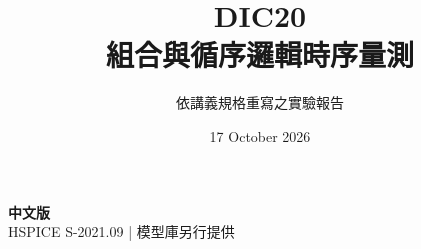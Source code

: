 \documentclass[11pt,a4paper]{article}
\title{\color{accent}DIC20\\[4pt]組合與循序邏輯時序量測}
\author{依講義規格重寫之實驗報告}
\date{17 October 2026}
\begin{document}
\maketitle
\begin{center}\small\textbf{中文版}\\
HSPICE S-2021.09 \quad | \quad 模型庫另行提供
\end{center}


\end{document}
